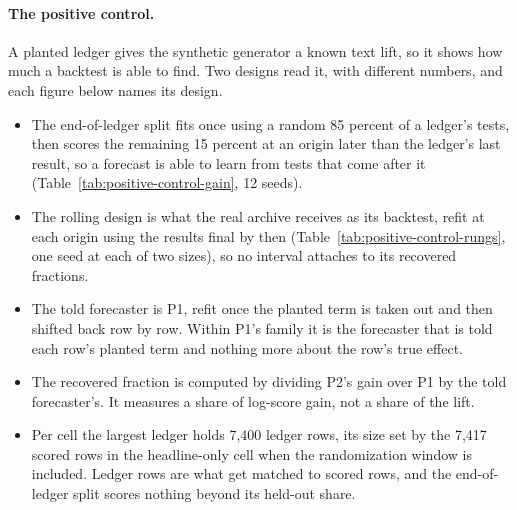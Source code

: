 \paragraph{The positive control.}
A planted ledger gives the synthetic generator a known text lift, so it shows how much a backtest is able to find.
Two designs read it, with different numbers, and each figure below names its design.
\begin{itemize}
\item The end-of-ledger split fits once using a random 85 percent of a ledger's tests, then scores the remaining 15 percent at an origin later than the ledger's last result, so a forecast is able to learn from tests that come after it (Table~\ref{tab:positive-control-gain}, 12 seeds).
\item The rolling design is what the real archive receives as its backtest, refit at each origin using the results final by then (Table~\ref{tab:positive-control-rungs}, one seed at each of two sizes), so no interval attaches to its recovered fractions.
\item The told forecaster is P1, refit once the planted term is taken out and then shifted back row by row. Within P1's family it is the forecaster that is told each row's planted term and nothing more about the row's true effect.
\item The recovered fraction is computed by dividing P2's gain over P1 by the told forecaster's. It measures a share of log-score gain, not a share of the lift.
\item Per cell the largest ledger holds 7,400 ledger rows, its size set by the 7,417 scored rows in the headline-only cell when the randomization window is included. Ledger rows are what get matched to scored rows, and the end-of-ledger split scores nothing beyond its held-out share.

\end{itemize}
